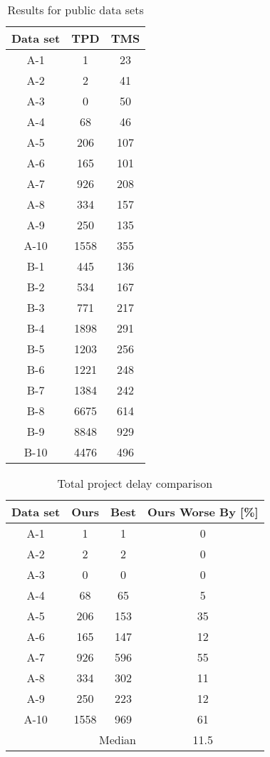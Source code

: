 \documentclass[10pt,a4paper]{article}
\begin{document}
\begin{table}
\caption{Results for public data sets}
\centering
\begin{tabular}{c||c|c}
Data set & TPD & TMS \\ 
\hline 
\hline 
A-1 & 1 & 23 \\ 
\hline 
A-2 & 2 & 41 \\ 
\hline 
A-3 & 0 & 50 \\ 
\hline 
A-4 & 68 & 46 \\ 
\hline 
A-5 & 206 & 107 \\ 
\hline 
A-6 & 165 & 101 \\ 
\hline 
A-7 & 926 & 208 \\ 
\hline 
A-8 & 334 & 157 \\ 
\hline 
A-9 & 250 & 135 \\ 
\hline 
A-10 & 1558 & 355\\ 
\hline 
B-1 & 445 & 136\\ 
\hline 
B-2 & 534 & 167\\ 
\hline 
B-3 & 771 & 217\\ 
\hline 
B-4 & 1898 & 291\\ 
\hline 
B-5 & 1203 & 256\\ 
\hline 
B-6 & 1221 & 248\\ 
\hline 
B-7 & 1384 & 242\\
\hline 
B-8 & 6675 & 614\\ 
\hline 
B-9 & 8848 & 929\\ 
\hline 
B-10 & 4476 & 496\\ 
\end{tabular} 
\label{table:results}
\end{table}

\begin{table}
\caption{Total project delay comparison}
\centering
\begin{tabular}{c||c|c||c}
Data set & Ours & Best & Ours Worse By [\%]\\ 
\hline 
\hline 
A-1 & 1 & 1 & 0\\ 
\hline 
A-2 & 2 & 2 & 0\\ 
\hline 
A-3 & 0 & 0 & 0\\ 
\hline 
A-4 & 68 & 65 & 5\\ 
\hline 
A-5 & 206 & 153 & 35\\ 
\hline 
A-6 & 165 & 147 & 12\\ 
\hline 
A-7 & 926 & 596 & 55\\ 
\hline 
A-8 & 334 & 302 & 11\\ 
\hline 
A-9 & 250 & 223 & 12\\ 
\hline 
A-10 & 1558 & 969 & 61\\
\hline 
\hline 
\multicolumn{3}{r||}{Median} & 11.5 \\ 
\end{tabular} 
\label{table:comparison}
\end{table}
\end{document}
